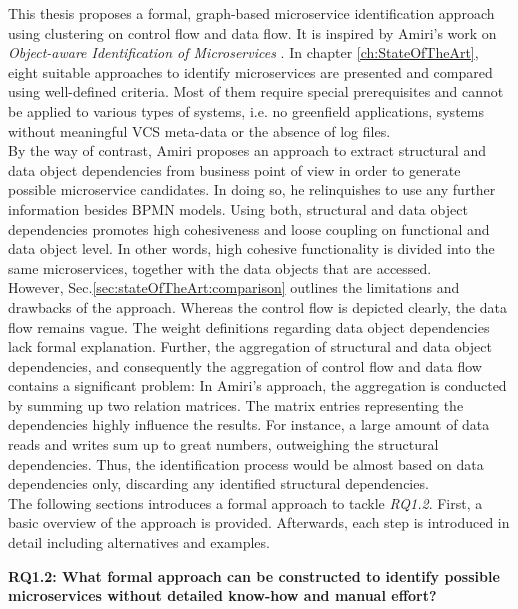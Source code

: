\noindent
This thesis proposes a formal, graph-based microservice identification approach using clustering on control flow and data flow. It is  inspired by Amiri’s work on \textit{Object-aware Identification of Microservices} \cite{ObjectAwareAmiri}. In chapter \ref{ch:StateOfTheArt}, eight suitable approaches to identify microservices are presented and compared using well-defined criteria. Most of them require special prerequisites and cannot be applied to various types of systems, i.e. no greenfield applications, systems without meaningful VCS meta-data or the absence of log files.
\\
By the way of contrast, Amiri proposes an approach to extract structural and data object dependencies from business point of view in order to generate possible microservice candidates. In doing so, he relinquishes to use any further information besides BPMN models. Using both, structural and data object dependencies promotes high cohesiveness and loose coupling on functional and data object level. In other words, high cohesive functionality is divided into the same microservices, together with the data objects that are accessed. \\
However, Sec.\ref{sec:stateOfTheArt:comparison} outlines the limitations and drawbacks of the approach. Whereas the control flow is depicted clearly, the data flow remains vague. The weight definitions regarding data object dependencies lack formal explanation. Further, the aggregation of structural and data object dependencies, and consequently the aggregation of control flow and data flow contains a significant problem: In Amiri's approach, the aggregation is conducted by summing up two relation matrices. The matrix entries representing the dependencies highly influence the results. For instance, a large amount of data reads and writes sum up to great numbers, outweighing the structural dependencies. Thus, the identification process would be almost based on data dependencies only, discarding any identified structural dependencies. \\
The following sections introduces a formal approach to tackle \textit{RQ1.2}. First, a basic overview of the approach is provided. Afterwards, each step is introduced in detail including alternatives and examples. 




\vspace{0.5cm}
\par
\begingroup
\leftskip=1cm
\rightskip=1cm

\noindent
\textbf{RQ1.2: What formal approach can be constructed to identify possible microservices without detailed know-how and manual effort? }

